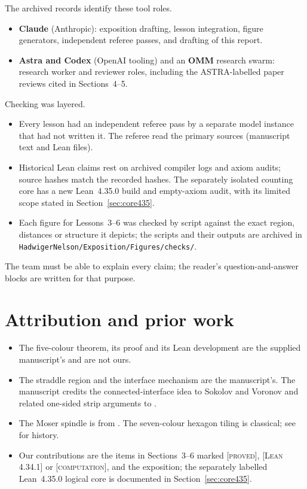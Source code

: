 \documentclass[11pt]{article}
\theoremstyle{definition}
\theoremstyle{remark}
\newcommand{\st}[1]{\textsc{[#1]}}
\begin{document}
The archived records identify these tool roles.
\begin{itemize}
\item \textbf{Claude} (Anthropic): exposition drafting, lesson integration, figure generators, independent referee passes, and drafting of this report.
\item \textbf{Astra and Codex} (OpenAI tooling) and an \textbf{OMM} research swarm: research worker and reviewer roles, including the ASTRA-labelled paper reviews cited in Sections~4--5.
\end{itemize}
Checking was layered.
\begin{itemize}
\item Every lesson had an independent referee pass by a separate model instance that had not written it. The referee read the primary sources (manuscript text and Lean files).
\item Historical Lean claims rest on archived compiler logs and axiom audits;
source hashes match the recorded hashes. The separately isolated counting core
has a new Lean~4.35.0 build and empty-axiom audit, with its limited scope stated
in Section~\ref{sec:core435}.
\item Each figure for Lessons~3--6 was checked by script against the exact region, distances or structure it depicts; the scripts and their outputs are archived in \texttt{HadwigerNelson/\allowbreak{}Exposition/\allowbreak{}Figures/\allowbreak{}checks/\allowbreak{}}.
\end{itemize}
The team must be able to explain every claim; the reader's question-and-answer blocks are written for that purpose.

\section{Attribution and prior work}
\begin{itemize}
\item The five-colour theorem, its proof and its Lean development are the supplied manuscript's \cite{OAI} and are not ours.
\item The straddle region and the interface mechanism are the manuscript's. The manuscript credits the connected-interface idea to Sokolov and Voronov \cite{SokolovVoronov} and related one-sided strip arguments to \cite{SokolovVoronov,Voronov}.
\item The Moser spindle is from \cite{MoserMoser}. The seven-colour hexagon tiling is classical; see \cite{Soifer} for history.
\item Our contributions are the items in Sections~3--6 marked \st{proved}, \st{Lean 4.34.1} or \st{computation}, and the exposition; the separately labelled Lean~4.35.0 logical core is documented in Section~\ref{sec:core435}.
\end{itemize}
\end{document}
